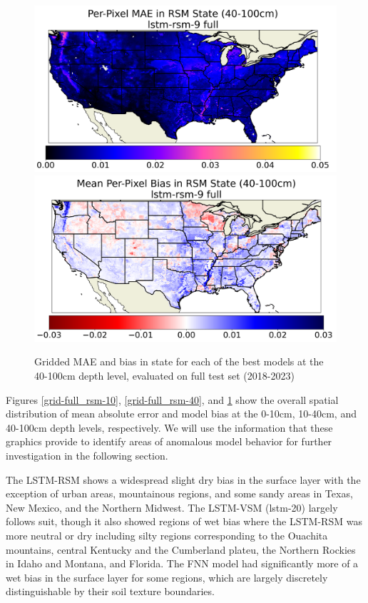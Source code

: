 \begin{figure}[hp!]
    \includegraphics[width=.48\linewidth,draft=false]{figures/grid-eval_best_full/eval-grid_full_lstm-rsm-9_rsm-100_spatial-stats_abs-err_state-err-abs-mean.png}
    \includegraphics[width=.48\linewidth,draft=false]{figures/grid-eval_best_full/eval-grid_full_lstm-rsm-9_rsm-100_spatial-stats_bias_state-err-bias-mean.png}

    \caption{Gridded MAE and bias in state for each of the best models at the 40-100cm depth level, evaluated on full test set (2018-2023)}
    \label{grid-full_rsm-100}
\end{figure}

Figures \ref{grid-full_rsm-10}, \ref{grid-full_rsm-40}, and \ref{grid-full_rsm-100} show the overall spatial distribution of mean absolute error and model bias at the 0-10cm, 10-40cm, and 40-100cm depth levels, respectively. We will use the information that these graphics provide to identify areas of anomalous model behavior for further investigation in the following section.

The LSTM-RSM shows a widespread slight dry bias in the surface layer with the exception of urban areas, mountainous regions, and some sandy areas in Texas, New Mexico, and the Northern Midwest. The LSTM-VSM (lstm-20) largely follows suit, though it also showed regions of wet bias where the LSTM-RSM was more neutral or dry including silty regions corresponding to the Ouachita mountains, central Kentucky and the Cumberland plateu, the Northern Rockies in Idaho and Montana, and Florida. The FNN model had significantly more of a wet bias in the surface layer for some regions, which are largely discretely distinguishable by their soil texture boundaries.

